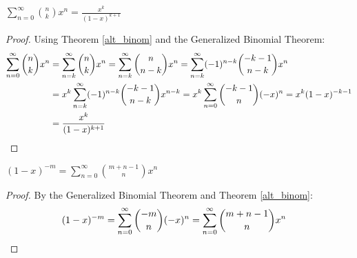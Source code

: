 \documentclass[a4paper]{article}
\begin{document}
\begin{theorem}\label{sum_bin_times_monom}
$\displaystyle\sum_{n=0}^\infty\binom nkx^n=\frac{x^k}{(1-x)^{k+1}}$

\begin{hl}
\begin{proof}
Using Theorem \ref{alt_binom} and the Generalized Binomial Theorem:
\begin{align*}
\sum_{n=0}^\infty\binom nkx^n
&= \sum_{n=k}^\infty\binom nkx^n
= \sum_{n=k}^\infty\binom n{n-k}x^n
= \sum_{n=k}^\infty(-1)^{n-k}\binom{-k-1}{n-k}x^n\\
&= x^k\sum_{n=k}^\infty(-1)^{n-k}\binom{-k-1}{n-k}x^{n-k}
= x^k\sum_{n=0}^\infty\binom{-k-1}{n}(-x)^{n}
= x^k(1-x)^{-k-1}\\
&=\frac{x^k}{(1-x)^{k+1}}\qedhere
\end{align*}
\end{proof}
\end{hl}
\end{theorem}

\begin{theorem}
$\displaystyle(1-x)^{-m}=\sum_{n=0}^\infty\binom{m+n-1}nx^n$

\begin{hl}
\begin{proof}
By the Generalized Binomial Theorem and Theorem \ref{alt_binom}:
\begin{align*}
(1-x)^{-m}
&=\sum_{n=0}^\infty\binom{-m}n(-x)^n
=\sum_{n=0}^\infty\binom{m+n-1}nx^n\qedhere
\end{align*}
\end{proof}
\end{hl}
\end{theorem}
\end{document}
